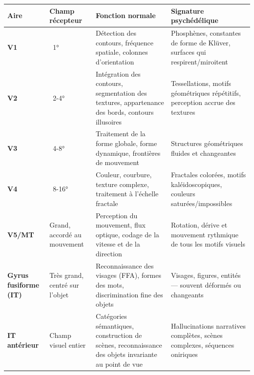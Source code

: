 \documentclass[11pt, twoside, openright]{book}
\begin{document}
\small
\begin{xltabular}{\linewidth}{X X X X}
\toprule
\textbf{Aire} & \textbf{Champ récepteur} & \textbf{Fonction normale} & \textbf{Signature psychédélique} \\
\midrule\endhead
\textbf{V1} & ~1° & Détection des contours, fréquence spatiale, colonnes d'orientation & Phosphènes, constantes de forme de Klüver, surfaces qui respirent/\allowbreak{}miroitent \\[4pt]
\textbf{V2} & ~2-4° & Intégration des contours, segmentation des textures, appartenance des bords, contours illusoires & Tessellations, motifs géométriques répétitifs, perception accrue des textures \\[4pt]
\textbf{V3} & ~4-8° & Traitement de la forme globale, forme dynamique, frontières de mouvement & Structures géométriques fluides et changeantes \\[4pt]
\textbf{V4} & ~8-16° & Couleur, courbure, texture complexe, traitement à l'échelle fractale & Fractales colorées, motifs kaléidoscopiques, couleurs saturées/\allowbreak{}impossibles \\[4pt]
\textbf{V5/\allowbreak{}MT} & Grand, accordé au mouvement & Perception du mouvement, flux optique, codage de la vitesse et de la direction & Rotation, dérive et mouvement rythmique de tous les motifs visuels \\[4pt]
\textbf{Gyrus fusiforme (IT)} & Très grand, centré sur l'objet & Reconnaissance des visages (FFA), formes des mots, discrimination fine des objets & Visages, figures, entités --- souvent déformés ou changeants \\[4pt]
\textbf{IT antérieur} & Champ visuel entier & Catégories sémantiques, construction de scènes, reconnaissance des objets invariante au point de vue & Hallucinations narratives complètes, scènes complexes, séquences oniriques \\[4pt]
\bottomrule
\end{xltabular}
\normalsize
\end{document}
